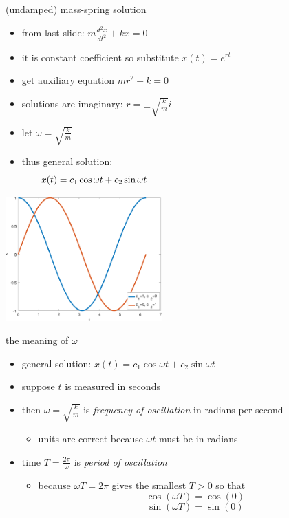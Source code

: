 \documentclass{beamer}
\begin{document}
\begin{frame}{(undamped) mass-spring solution}

\begin{itemize}
\item from last slide: $m \frac{d^2x}{dt^2} + k x = 0$
\item it is constant coefficient so substitute $x(t)=e^{rt}$
\item get auxiliary equation $m r^2 + k = 0$
\item solutions are imaginary: $r = \pm \sqrt{\frac{k}{m}} i$
\item let \alert{$\omega = \sqrt{\frac{k}{m}}$}
\item thus general solution:
    $$x(t) = c_1 \cos \omega t + c_2 \sin \omega t \hspace{70mm}$$
\end{itemize}

\vspace{-20mm}
\hfill \includegraphics[width=0.45\textwidth]{figs/cossin}
\end{frame}


\begin{frame}{the meaning of $\omega$}

\begin{itemize}
\item general solution: $x(t) = c_1 \cos \omega t + c_2 \sin \omega t$
\item suppose $t$ is measured in seconds
\item then $\omega = \sqrt{\frac{k}{m}}$ is \emph{frequency of oscillation} in radians per second
    \begin{itemize}
    \item units are correct because $\omega t$ must be in radians
    \end{itemize}
\item time \alert{$T = \frac{2\pi}{\omega}$} is \emph{period of oscillation}
    \begin{itemize}
    \item because $\omega T=2\pi$ gives the smallest $T>0$ so that
        $$\cos(\omega T) = \cos(0)$$
        $$\sin(\omega T) = \sin(0)$$
    \end{itemize}
\end{itemize}
\end{frame}
\end{document}
